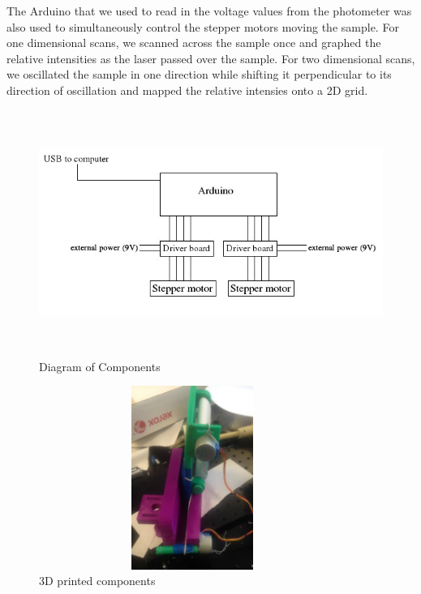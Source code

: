 \documentclass[letterpaper, 12pt]{article}
\begin{document}
\par
The Arduino that we used to read in the voltage values from the photometer was also used to simultaneously control the stepper motors moving the sample. For one dimensional scans, we scanned across the sample once and graphed the relative intensities as the laser passed over the sample. For two dimensional scans, we oscillated the sample in one direction while shifting it perpendicular to its direction of oscillation and mapped the relative intensies onto a 2D grid.

\begin{figure}[H]
  \centering
  \includegraphics[width=12cm,height=8cm]{setup_diagram}
  \caption{Diagram of Components}
\end{figure}

\newpage

\begin{figure}[H]
  \centering
  \includegraphics[width=10cm,height=6cm]{setup_picture}
  \caption[caption]{3D printed components\footnotemark}
\end{figure}
\end{document}
